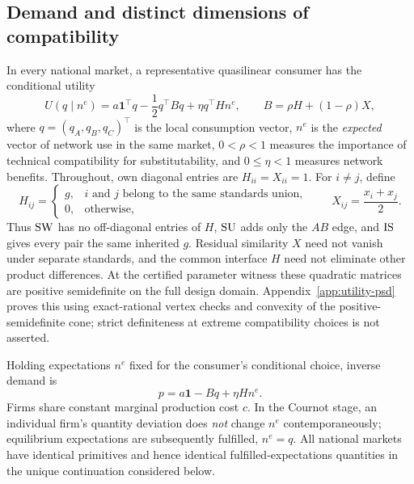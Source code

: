 \subsection{Demand and distinct dimensions of compatibility}

In every national market, a representative quasilinear consumer has
the conditional utility
\begin{equation}\label{eq:utility}
 U(q\mid n^e)
 =a\mathbf{1}^{\top}q-\frac{1}{2}q^{\top}Bq
       +\eta q^{\top}H n^e,\qquad
 B=\rho H+(1-\rho)X ,
\end{equation}
where $q=(q_A,q_B,q_C)^\top$ is the local consumption vector,
$n^e$ is the \emph{expected} vector of network use in the same
market, $0<\rho<1$ measures the importance of technical
compatibility for substitutability, and $0\leq\eta<1$ measures
network benefits. Throughout, own diagonal entries are
$H_{ii}=X_{ii}=1$. For $i\ne j$, define
\begin{equation}\label{eq:matrices}
 H_{ij}=
 \begin{cases}
 g,&\text{$i$ and $j$ belong to the same standards union},\\
 0,&\text{otherwise},
 \end{cases}
 \qquad
 X_{ij}=\frac{x_i+x_j}{2}.
\end{equation}
Thus $\mathrm{SW}$ has no off-diagonal entries of $H$, $\mathrm{SU}$ adds only the
$AB$ edge, and $\mathrm{IS}$ gives every pair the same inherited $g$.
Residual similarity $X$ need not vanish under separate standards,
and the common interface $H$ need not eliminate other product
differences. At the certified parameter witness these quadratic matrices
are positive semidefinite on the full design domain.
Appendix~\ref{app:utility-psd} proves this using
exact-rational vertex checks and convexity of the
positive-semidefinite cone; strict definiteness at
extreme compatibility choices is not asserted.

Holding expectations $n^e$ fixed for the consumer's conditional
choice, inverse demand is
\begin{equation}\label{eq:demand}
 p=a\mathbf{1}-Bq+\eta H n^e.
\end{equation}
Firms share constant marginal production cost $c$. In the Cournot
stage, an individual firm's quantity deviation does \emph{not}
change $n^e$ contemporaneously; equilibrium expectations are
subsequently fulfilled, $n^e=q$. All national markets have
identical primitives and hence identical fulfilled-expectations
quantities in the unique continuation considered below.

